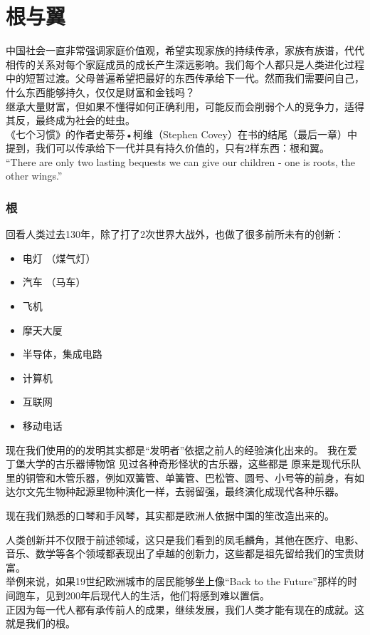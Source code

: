 \chapter{根与翼} %

中国社会一直非常强调家庭价值观，希望实现家族的持续传承，家族有族谱，代代相传的关系对每个家庭成员的成长产生深远影响。我们每个人都只是人类进化过程中的短暂过渡。父母普遍希望把最好的东西传承给下一代。然而我们需要问自己，什么东西能够持久，仅仅是财富和金钱吗？\\
继承大量财富，但如果不懂得如何正确利用，可能反而会削弱个人的竞争力，适得其反，最终成为社会的蛀虫。\\
《七个习惯》的作者史蒂芬•柯维（Stephen
Covey）在书的结尾（最后一章）中提到，我们可以传承给下一代并具有持久价值的，只有2样东西：根和翼。\\
``There are only two lasting bequests we can give our children - one is
roots, the other wings.''

\hypertarget{ux6839}{%
\subsection{根}\label{ux6839}}

回看人类过去130年，除了打了2次世界大战外，也做了很多前所未有的创新：

\begin{itemize}
\tightlist
\item
  电灯 （煤气灯）
\item
  汽车 （马车）
\item
  飞机
\item
  摩天大厦
\item
  半导体，集成电路
\item
  计算机
\item
  互联网
\item
  移动电话
\end{itemize}

现在我们使用的的发明其实都是“发明者”依据之前人的经验演化出来的。
我在爱丁堡大学的古乐器博物馆 见过各种奇形怪状的古乐器，这些都是
原来是现代乐队里的铜管和木管乐器，例如双簧管、单簧管、巴松管、圆号、小号等的前身，有如达尔文先生物种起源里物种演化一样，去弱留强，最终演化成现代各种乐器。

现在我们熟悉的口琴和手风琴，其实都是欧洲人依据中国的笙改造出来的。

人类创新并不仅限于前述领域，这只是我们看到的凤毛麟角，其他在医疗、电影、音乐、数学等各个领域都表现出了卓越的创新力，这些都是祖先留给我们的宝贵财富。\\
举例来说，如果19世纪欧洲城市的居民能够坐上像``Back to the
Future''那样的时间跑车，见到200年后现代人的生活，他们将感到难以置信。\\
正因为每一代人都有承传前人的成果，继续发展，我们人类才能有现在的成就。这就是我们的根。

